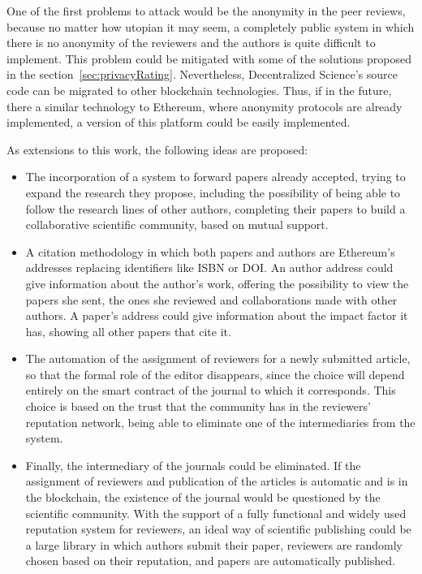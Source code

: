 One of the first problems to attack would be the anonymity in the peer reviews,
because no matter how utopian it may seem, a completely public system in which
there is no anonymity of the reviewers and the authors is quite difficult to
implement. This problem could be mitigated with some of the solutions proposed
in the section~\ref{sec:privacyRating}. Nevertheless, Decentralized Science's
source code can be migrated to other blockchain technologies. Thus, if in the
future, there a similar technology to Ethereum, where anonymity protocols are
already implemented, a version of this platform could be easily implemented.

As extensions to this work, the following ideas are proposed:

\begin{itemize}
\item The incorporation of a system to forward papers already accepted, trying
  to expand the research they propose, including the possibility of being able
  to follow the research lines of other authors, completing their papers to
  build a collaborative scientific community, based on mutual support.
\item A citation methodology in which both papers and authors are Ethereum's
  addresses replacing identifiers like ISBN or DOI. An author address could give
  information about the author's work, offering the possibility to view the
  papers she sent, the ones she reviewed and collaborations made with other
  authors. A paper's address could give information about the impact factor it
  has, showing all other papers that cite it.
\item The automation of the assignment of reviewers for a newly submitted
  article, so that the formal role of the editor disappears, since the choice
  will depend entirely on the smart contract of the journal to which it
  corresponds. This choice is based on the trust that the community has in the
  reviewers' reputation network, being able to eliminate one of the
  intermediaries from the system.
\item Finally, the intermediary of the journals could be eliminated. If the
  assignment of reviewers and publication of the articles is automatic and is in
  the blockchain, the existence of the journal would be questioned by the
  scientific community. With the support of a fully functional and widely used
  reputation system for reviewers, an ideal way of scientific publishing could
  be a large library in which authors submit their paper, reviewers are randomly
  chosen based on their reputation, and papers are automatically published.
\end{itemize}

